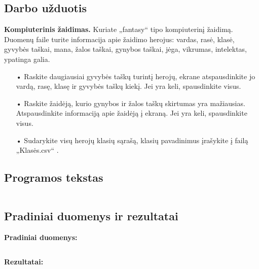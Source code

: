 \documentclass{article}
\begin{document}
\subsection{Darbo užduotis}
\textbf{Kompiuterinis žaidimas.} Kuriate „fantasy“ tipo kompiuterinį žaidimą. Duomenų faile turite informacija apie žaidimo herojus: vardas, rasė, klasė, gyvybės taškai, mana, žalos taškai, gynybos taškai, jėga, vikrumas, intelektas, ypatinga galia.
\begin{itemize}
    \item[•]Raskite daugiausiai gyvybės taškų turintį herojų, ekrane atspausdinkite jo vardą, rasę, klasę ir gyvybės taškų kiekį. Jei yra keli, spausdinkite visus.
    \item[•]Raskite žaidėją, kurio gynybos ir žalos taškų skirtumas yra mažiausias. Atspausdinkite informaciją apie žaidėją į ekraną. Jei yra keli, spausdinkite visus. 
    \item[•]Sudarykite visų herojų klasių sąrašą, klasių pavadinimus įrašykite į failą „Klasės.csv“ .
\end{itemize}


\subsection{Programos tekstas}

\inputminted{csharp}{Assets/L1/L1-rawtext.txt}

\subsection{Pradiniai duomenys ir rezultatai}

\textbf{Pradiniai duomenys:}

\inputminted{csharp}{Assets/L1/herojai.csv}

\normalsize
\begin{changemargin}{0cm}{0cm}
    \textbf{Rezultatai:}
\end{changemargin}
\end{document}
